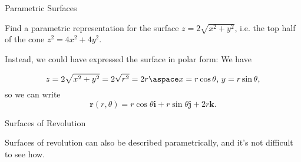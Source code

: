 \documentclass[11pt,english,
handout
]{beamer}
\begin{document}
\begin{frame}[t]{Parametric Surfaces}
\small
\begin{example}
Find a parametric representation for the surface $z=2\sqrt{x^2+y^2}$, i.e. the top half of the cone $z^2=4x^2+4y^2$.

\lspace
Instead, we could have expressed the surface in polar form: \pause We have

\[
z=2\sqrt{x^2+y^2}=2\sqrt{r^2}=2r\aspace x=r\cos\theta, \,y=r\sin\theta, 
\]
so we can write
\[
\mathbf{r}(r,\theta)=r\cos\theta\mathbf{i}+r\sin\theta\mathbf{j}+2r\mathbf{k}.
\]
\end{example}
\end{frame}








\begin{frame}[t]{Surfaces of Revolution}
\small

Surfaces of revolution can also be described parametrically, and it's not difficult to see how.   
\begin{minipage}{0.5\textwidth}
\centering
{}
\end{minipage}%
\begin{minipage}{0.5\textwidth}
\centering
{}
\end{minipage}
\end{frame}
\end{document}
